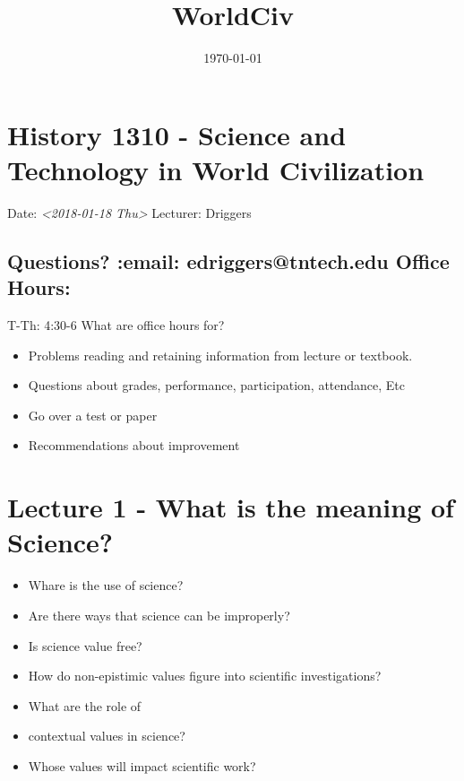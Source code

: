 \documentclass[11pt]{article}
\date{\today}
\title{WorldCiv}
\begin{document}
\maketitle
\tableofcontents

\section{History 1310 - Science and Technology in World Civilization}
\label{sec-1}

Date: \textit{<2018-01-18 Thu>} Lecturer: Driggers

\subsection{Questions? :email: edriggers@tntech.edu \textbf{Office Hours}:}
\label{sec-1-1}
T-Th: 4:30-6
What are office hours for? 
\begin{itemize}
\item Problems reading and retaining information from lecture or textbook.

\item Questions about grades, performance, participation, attendance, Etc

\item Go over a test or paper

\item Recommendations about improvement
\end{itemize}

\section{Lecture 1 - What is the meaning of Science?}
\label{sec-2}

\begin{itemize}
\item Whare is the use of science?

\item Are there ways that science can be improperly?

\item Is science value free?

\item How do non-epistimic values figure into scientific investigations?

\item What are the role of

\item contextual values in science?

\item Whose values will impact scientific work?
\end{itemize}
\end{document}
